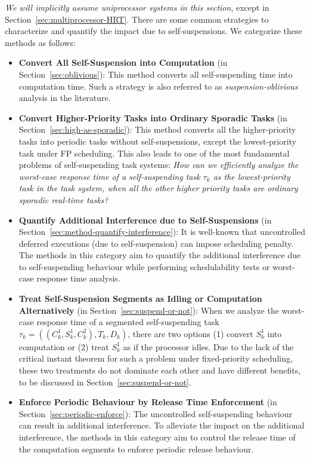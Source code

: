 \emph{We will implicitly assume uniprocessor systems in this section}, except in Section~\ref{sec:multiprocessor-HRT}. There are some common strategies to characterize and quantify the impact due to self-suspensions. We categorize these methods as follows:
\begin{itemize}
\item \textbf{Convert All Self-Suspension into Computation} (in
  Section~\ref{sec:oblivious}): This method converts all self-suspending time
  into computation time. Such a strategy is also referred to as
  \emph{suspension-oblivious} analysis in the literature.
\item \textbf{Convert Higher-Priority Tasks into Ordinary Sporadic Tasks} (in
  Section~\ref{sec:high-as-sporadic}): This method converts all the
  higher-priority tasks into periodic tasks without self-suspensions,
  except the lowest-priority task under FP scheduling. This also leads
  to one of the most fundamental problems of self-suspending task
  systems: \emph{How can we efficiently analyze the worst-case response time
  of a self-suspending task $\tau_k$ as the lowest-priority task in
  the task system, when all the other higher priority tasks are
  ordinary sporadic real-time tasks?}
\item \textbf{Quantify Additional Interference due to
    Self-Suspensions} (in
  Section~\ref{sec:method-quantify-interference}): It is well-known
  that uncontrolled deferred executions (due to self-suspension) can
  impose scheduling penalty. The methods in this category aim to
  quantify the additional interference due to self-suspending
  behaviour while performing schedulability tests or worst-case
  response time analysis.

\item \textbf{Treat Self-Suspension Segments as Idling or Computation
    Alternatively} (in Section~\ref{sec:suspend-or-not}): When we
  analyze the worst-case response time of a segmented self-suspending
  task $\tau_k = ((C_k^1, S_k^1, C_k^2), T_k, D_k)$, there are two
  options (1) convert $S_k^1$ into computation or (2) treat $S_k^1$ as
  if the processor idles. Due to the lack of the critical instant
  theorem for such a problem under fixed-priority scheduling, these two treatments
  do not dominate each other and have different benefits, to be
  discussed in Section~\ref{sec:suspend-or-not}.

\item \textbf{Enforce Periodic Behaviour by Release Time Enforcement} (in
  Section~\ref{sec:periodic-enforce}): The uncontrolled
  self-suspending behaviour can result in additional interference.  To
  alleviate the impact on the additional interference, the methods in
  this category aim to control the release time of the computation
  segments to enforce periodic release behaviour.
\end{itemize}


